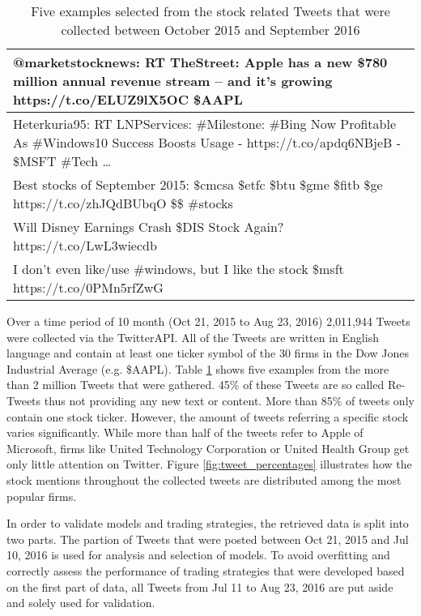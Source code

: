 \documentclass[a4paper,12pt]{article}%
\begin{document}
\begin{table}
\centering
\captionsetup{justification=centering}
\begin{tabular}{|p{\textwidth}|}
\hline
@marketstocknews: RT TheStreet: Apple has a new \$780 million annual revenue stream -- and it's growing https://t.co/ELUZ9lX5OC  \$AAPL \\ \hline

Heterkuria95: RT LNPServices: \#Milestone: \#Bing Now Profitable As \#Windows10 Success Boosts Usage - https://t.co/apdq6NBjeB - \$MSFT \#Tech … \\ \hline

Best stocks of September 2015: \$cmcsa \$etfc \$btu \$gme \$fitb \$ge https://t.co/zhJQdBUbqO \$\$ \#stocks \\ \hline

Will Disney Earnings Crash \$DIS Stock Again? https://t.co/LwL3wiecdb \\ \hline

I don't even like/use \#windows, but I like the stock \$msft https://t.co/0PMn5rfZwG \\ \hline

\end{tabular}
\caption[Examples of the Collected Tweets]{Five examples selected from the stock related Tweets that were collected between October 2015 and September 2016 \label{table:weet_examples}}
\end{table}

Over a time period of 10 month (Oct 21, 2015 to Aug 23, 2016) 2,011,944 Tweets were collected via the TwitterAPI. All of the Tweets are written in English language and contain at least one ticker symbol of the 30 firms in the Dow Jones Industrial Average (e.g. \$AAPL). Table \ref{table:weet_examples} shows five examples from the more than 2 million Tweets that were gathered. 45\% of these Tweets are so called Re-Tweets thus not providing any new text or content. More than 85\% of tweets only contain one stock ticker. However, the amount of tweets referring a specific stock varies significantly. While  more than half of the tweets refer to Apple of Microsoft, firms like United Technology Corporation or United Health Group get only little attention on Twitter. Figure \ref{fig:tweet_percentages} illustrates how the stock mentions throughout the collected tweets are distributed among the most popular firms.

In order to validate models and trading strategies, the retrieved data is split into two parts. The partion of Tweets that were posted between Oct 21, 2015 and Jul 10, 2016 is used for analysis and selection of models. To avoid overfitting and correctly assess the performance of trading strategies that were developed based on the first part of data, all Tweets from Jul 11 to Aug 23, 2016 are put aside and solely used for validation.
\end{document}
